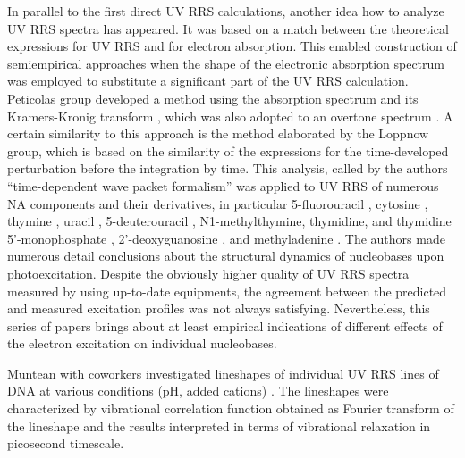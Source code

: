 In parallel to the first direct UV RRS calculations, another idea how to
analyze UV RRS spectra has appeared.
It was based on a match between the theoretical expressions for UV RRS and for
electron absorption.
This enabled construction of semiempirical approaches when the shape of the
electronic absorption spectrum was employed to substitute a significant part of
the UV RRS calculation.
Peticolas group developed a method using the absorption spectrum and its
Kramers-Kronig transform
\parencite{Blazej1980},
which was also adopted to an overtone spectrum
\parencite{Chinsky1982a}.
A certain similarity to this approach is the method elaborated by the Loppnow
group, which is based on the similarity of the expressions for the
time-developed perturbation before the integration by time.
This analysis, called by the authors “time-dependent wave packet formalism” was
applied to UV RRS of numerous NA components and their derivatives, in
particular 5-fluorouracil
\parencite{Billinghurst2006a},
cytosine
\parencite{Billinghurst2006},
thymine
\parencite{Yarasi2007},
uracil
\parencite{Yarasi2009},
5-deuterouracil
\parencite{Ng2011},
N1-methylthymine, thymidine, and thymidine 5'-monophosphate
\parencite{Billinghurst2012},
2'-deoxyguanosine
\parencite{El-Yazbi2011},
and methyladenine
\parencite{Oladepo2011}.
The authors made numerous detail conclusions about the structural dynamics of
nucleobases upon photoexcitation.
Despite the obviously higher quality of UV RRS spectra measured by using
up-to-date equipments, the agreement between the predicted and measured
excitation profiles was not always satisfying.
Nevertheless, this series of papers brings about at least empirical indications
of different effects of the electron excitation on individual nucleobases.

Muntean with coworkers investigated lineshapes of individual UV RRS lines of
DNA at various conditions (pH, added cations)
\parencite{%
	Muntean2017,%
	Muntean2020%
}.
The lineshapes were characterized by vibrational correlation function obtained
as Fourier transform of the lineshape and the results interpreted in terms of
vibrational relaxation in picosecond timescale.
